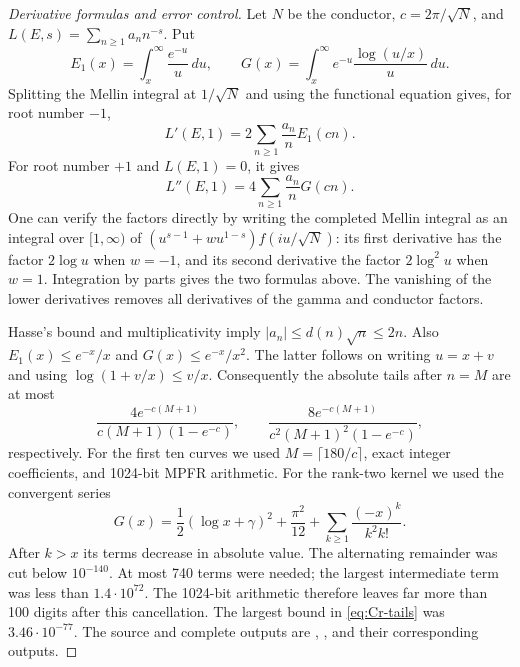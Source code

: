 \begin{proof}[Derivative formulas and error control]
Let $N$ be the conductor, $c=2\pi/\sqrt N$, and
$L(E,s)=\sum_{n\geq1}a_nn^{-s}$. Put
\[
 E_1(x)=\int_x^\infty\frac{e^{-u}}u\,du,
 \qquad G(x)=\int_x^\infty e^{-u}\frac{\log(u/x)}u\,du.
\]
Splitting the Mellin integral at $1/\sqrt N$ and using the functional
equation gives, for root number $-1$,
\begin{equation}\label{eq:Cr-first}
 L'(E,1)=2\sum_{n\geq1}\frac{a_n}{n}E_1(cn).
\end{equation}
For root number $+1$ and $L(E,1)=0$, it gives
\begin{equation}\label{eq:Cr-second}
 L''(E,1)=4\sum_{n\geq1}\frac{a_n}{n}G(cn).
\end{equation}
One can verify the factors directly by writing the completed Mellin
integral as an integral over $[1,\infty)$ of
$(u^{s-1}+wu^{1-s})f(iu/\sqrt N)$: its first derivative has
the factor $2\log u$ when $w=-1$, and its second derivative
the factor $2\log^2u$ when $w=1$. Integration by parts gives
the two formulas above. The vanishing of the lower derivatives
removes all derivatives of the gamma and conductor factors.

Hasse's bound and multiplicativity imply
$|a_n|\leq d(n)\sqrt n\leq2n$. Also
$E_1(x)\leq e^{-x}/x$ and $G(x)\leq e^{-x}/x^2$.
The latter follows on writing $u=x+v$ and using
$\log(1+v/x)\leq v/x$. Consequently the absolute tails after
$n=M$ are at most
\begin{equation}\label{eq:Cr-tails}
 \frac{4e^{-c(M+1)}}{c(M+1)(1-e^{-c})},\qquad
 \frac{8e^{-c(M+1)}}{c^2(M+1)^2(1-e^{-c})},
\end{equation}
respectively. For the first ten curves we used
$M=\lceil180/c\rceil$, exact integer coefficients, and 1024-bit
MPFR arithmetic. For the rank-two kernel we used the convergent series
\[
 G(x)=\frac12(\log x+\gamma)^2+\frac{\pi^2}{12}
       +\sum_{k\geq1}\frac{(-x)^k}{k^2k!}.
\]
After $k>x$ its terms decrease in absolute value. The alternating
remainder was cut below $10^{-140}$. At most 740 terms were needed;
the largest intermediate term was less than $1.4\cdot10^{72}$.
The 1024-bit arithmetic therefore leaves far more than 100 digits
after this cancellation. The largest bound in
\eqref{eq:Cr-tails} was $3.46\cdot10^{-77}$. The source and complete
outputs are ,
, and their corresponding outputs.


\end{proof}
